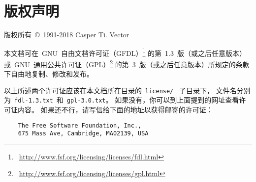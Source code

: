 \cleardoublepage
\chapter*{\textbf{版权声明}}
{
\begin{comment}
	任何收存和保管本论文各种版本的单位和个人，
	未经本论文作者同意，不得将本论文转借他人，
	亦不得随意复制、抄录、拍照或以任何方式传播。
	否则一旦引起有碍作者著作权之问题，将可能承担法律责任。
\end{comment}
	版权所有~\copyright~1991-2018 Casper Ti. Vector

	本文档可在~GNU~自由文档许可证（GFDL）\footnote%
	{\ \url{http://www.fsf.org/licensing/licenses/fdl.html}}%
	的第~1.3~版（或之后任意版本）或~GNU~通用公共许可证（GPL）\footnote%
	{\ \url{http://www.fsf.org/licensing/licenses/gpl.html}}%
	的第~3~版（或之后任意版本）所规定的条款下自由地复制、修改和发布。
	
	以上所述两个许可证应该在本文档所在目录的~\verb|license/|~%
	\linebreak[1]子目录下，
	文件名分别为~\verb|fdl-1.3.txt|~和~\verb|gpl-3.0.txt|。
	如果没有，你可以到上面提到的网址查看许可证内容。
	如果还不行，请写信给下面的地址以获得邮寄的许可证：
\begin{verbatim}
    The Free Software Foundation, Inc.,
    675 Mass Ave, Cambridge, MA02139, USA 
\end{verbatim}
	\par
}

